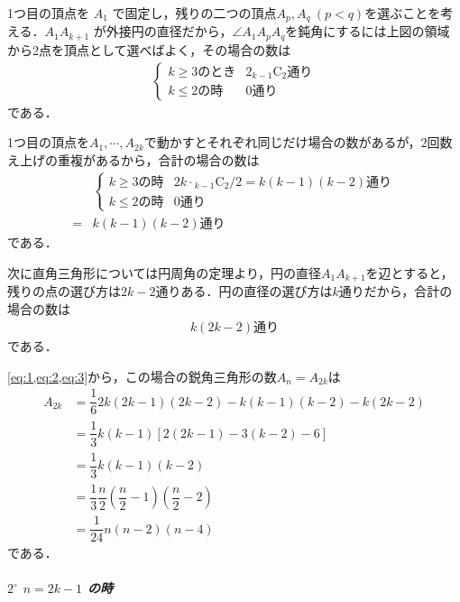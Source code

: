 \documentclass[../../main.tex]{subfiles}
\begin{document}
1つ目の頂点を $A_1$ で固定し，残りの二つの頂点$A_p,A_q \ (p<q)$を選ぶことを考える．$A_1 A_{k+1}$ が外接円の直径だから，$\angle A_1A_pA_q$を鈍角にするには上図の領域から2点を頂点として選べばよく，その場合の数は
\begin{align}
  \begin{cases}
    k \ge 3 \text{のとき} & 2{}_{k-1}\mathrm{C}_2 \text{通り} \\
    k \le 2 \text{の時} & 0 \text{通り}
  \end{cases}
\end{align}
である．

1つ目の頂点を$A_1,\cdots,A_{2k}$で動かすとそれぞれ同じだけ場合の数があるが，$2$回数え上げの重複があるから，合計の場合の数は
\begin{align}
  &
  \begin{cases}
    k \ge 3 \text{の時} & 2k \cdot {}_{k-1}\mathrm{C}_2 / 2 = k(k-1)(k-2) \text{通り} \\
    k \le 2 \text{の時} & 0 \text{通り}
  \end{cases} \\
  =& k(k-1)(k-2) \text{通り} \label{eq:2}
\end{align}
である．

次に直角三角形については円周角の定理より，円の直径$A_1A_{k+1}$を辺とすると，残りの点の選び方は$2k-2$通りある．円の直径の選び方は$k$通りだから，合計の場合の数は
\begin{align}
  k(2k-2) \text{通り} \label{eq:3}
\end{align}
である．

\cref{eq:1,eq:2,eq:3}から，この場合の鋭角三角形の数$A_{n}=A_{2k}$は
\begin{align}
  A_{2k}
  & = \dfrac{1}{6}2k(2k-1)(2k-2) - k(k-1)(k-2) - k(2k-2) \\
  & = \dfrac{1}{3}k(k-1)\left[2(2k-1)-3(k-2)-6\right] \\
  & = \dfrac{1}{3}k(k-1)(k-2) \\
  & = \dfrac{1}{3}\dfrac{n}{2}(\dfrac{n}{2}-1)(\dfrac{n}{2}-2) \\
  & = \dfrac{1}{24}n(n-2)(n-4) \label{eq:4}
\end{align}
である．

\subparagraph{$2^\circ$ $n = 2k-1$ の時}
\end{document}
